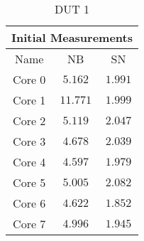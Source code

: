 \begin{table}[H]
    \centering
    \begin{tabular}{|| c | c | c ||}
    \hline
    \multicolumn{3}{||c||}{Initial Measurements} \\ [0.5ex] \hline\hline
    Name & NB & SN \\\hline
    Core 0 & $5.162$ & $1.991$ \\
    Core 1 & $11.771$ & $1.999$ \\
    Core 2 & $5.119$ & $2.047$ \\
    Core 3 & $4.678$ & $2.039$ \\
    Core 4 & $4.597$ & $1.979$ \\
    Core 5 & $5.005$ & $2.082$ \\
    Core 6 & $4.622$ & $1.852$ \\
    Core 7 & $4.996$ & $1.945$ \\\hline
    \end{tabular}
    \caption{DUT 1}
    \label{tab:initial-measurements-exp-3-dut-1}
\end{table}